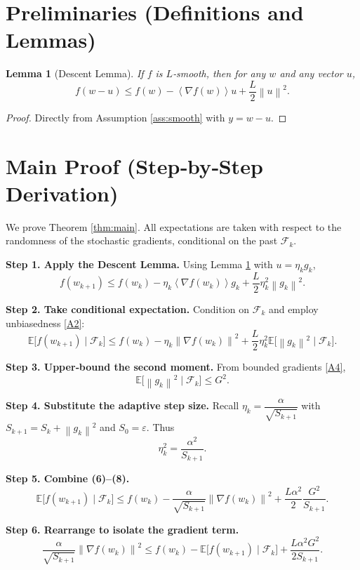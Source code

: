 \documentclass{article}
\newtheorem{lemma}{Lemma}
\newcommand{\E}{\mathbb{E}}
\newcommand{\norm}[1]{\left\lVert#1\right\rVert}
\newcommand{\inner}[1]{\left\langle#1\right\rangle}
\begin{document}
\section*{Preliminaries (Definitions and Lemmas)}
\begin{lemma}[Descent Lemma]\label{lem:descent}
If $f$ is $L$‑smooth, then for any $w$ and any vector $u$,
\[
f(w-u)\le f(w)-\inner{\nabla f(w)}{u}+\frac{L}{2}\norm{u}^{2}.
\tag{L1}
\]
\end{lemma}
\begin{proof}
Directly from Assumption \ref{ass:smooth} with $y=w-u$.
\end{proof}

\section*{Main Proof (Step‑by‑Step Derivation)}
We prove Theorem \ref{thm:main}.  
All expectations are taken with respect to the randomness of the stochastic gradients, conditional on the past $\mathcal{F}_k$.

\noindent\textbf{Step 1. Apply the Descent Lemma.}  
Using Lemma \ref{lem:descent} with $u=\eta_k g_k$,
\[
f(w_{k+1})\le f(w_k)-\eta_k\inner{\nabla f(w_k)}{g_k}
+\frac{L}{2}\eta_k^{2}\norm{g_k}^{2}.
\tag{5}
\]

\noindent\textbf{Step 2. Take conditional expectation.}  
Condition on $\mathcal{F}_k$ and employ unbiasedness \eqref{A2}:
\[
\E\!\big[f(w_{k+1})\mid\mathcal{F}_k\big]
\le f(w_k)-\eta_k\norm{\nabla f(w_k)}^{2}
+\frac{L}{2}\eta_k^{2}\E\!\big[\norm{g_k}^{2}\mid\mathcal{F}_k\big].
\tag{6}
\]

\noindent\textbf{Step 3. Upper‑bound the second moment.}  
From bounded gradients \eqref{A4},
\[
\E\!\big[\norm{g_k}^{2}\mid\mathcal{F}_k\big]\le G^{2}.
\tag{7}
\]

\noindent\textbf{Step 4. Substitute the adaptive step size.}  
Recall $\eta_k=\dfrac{\alpha}{\sqrt{S_{k+1}}}$ with $S_{k+1}=S_{k}+\norm{g_k}^{2}$ and $S_0=\varepsilon$. Thus
\[
\eta_k^{2}= \frac{\alpha^{2}}{S_{k+1}}.
\tag{8}
\]

\noindent\textbf{Step 5. Combine (6)–(8).}
\[
\E\!\big[f(w_{k+1})\mid\mathcal{F}_k\big]
\le f(w_k)-\frac{\alpha}{\sqrt{S_{k+1}}}\norm{\nabla f(w_k)}^{2}
+\frac{L\alpha^{2}}{2}\frac{G^{2}}{S_{k+1}}.
\tag{9}
\]

\noindent\textbf{Step 6. Rearrange to isolate the gradient term.}
\[
\frac{\alpha}{\sqrt{S_{k+1}}}\norm{\nabla f(w_k)}^{2}
\le f(w_k)-\E\!\big[f(w_{k+1})\mid\mathcal{F}_k\big]
+\frac{L\alpha^{2}G^{2}}{2S_{k+1}}.
\tag{10}
\]
\end{document}
